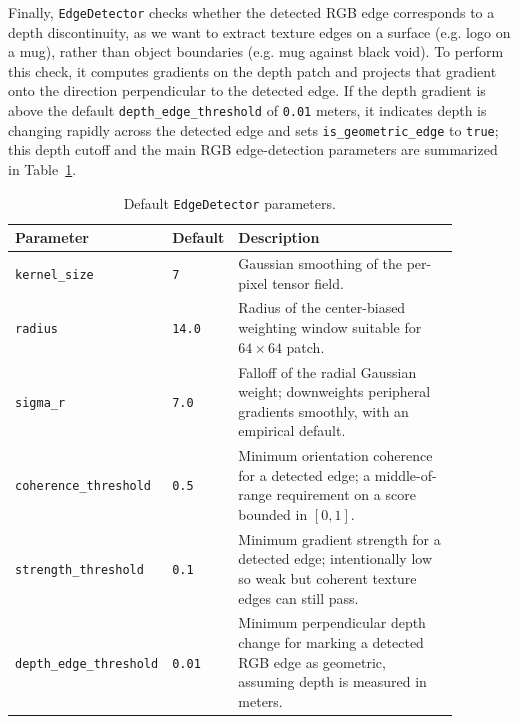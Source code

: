 \documentclass{article}
\begin{document}

Finally, \texttt{EdgeDetector} checks whether the detected RGB edge corresponds to a depth discontinuity, as we want to extract texture edges on a surface (e.g. logo on a mug), rather than object boundaries (e.g. mug against black void).
To perform this check, it computes gradients on the depth patch and projects that gradient onto the direction perpendicular to the detected edge.
If the depth gradient is above the default \texttt{depth\_edge\_threshold} of \texttt{0.01} meters, it indicates depth is changing rapidly across the detected edge and sets \texttt{is\_geometric\_edge} to \texttt{true}; this depth cutoff and the main RGB edge-detection parameters are summarized in Table~\ref{tab:edge-detector-parameters}.


\begin{table}[ht]
  \centering
  \begin{tabular}{p{0.25\linewidth} p{0.13\linewidth} p{0.50\linewidth}}
    \hline
    Parameter & Default & Description \\
    \hline
    \texttt{kernel\_size} & \texttt{7} & Gaussian smoothing of the per-pixel tensor field. \\
    \texttt{radius} & \texttt{14.0} & Radius of the center-biased weighting window suitable for $64 \times 64$ patch. \\
    \texttt{sigma\_r} & \texttt{7.0} & Falloff of the radial Gaussian weight; downweights peripheral gradients smoothly, with an empirical default. \\
    \texttt{coherence\_threshold} & \texttt{0.5} & Minimum orientation coherence for a detected edge; a middle-of-range requirement on a score bounded in $[0, 1]$. \\
    \texttt{strength\_threshold} & \texttt{0.1} & Minimum gradient strength for a detected edge; intentionally low so weak but coherent texture edges can still pass. \\
    \texttt{depth\_edge\_threshold} & \texttt{0.01} & Minimum perpendicular depth change for marking a detected RGB edge as geometric, assuming depth is measured in meters. \\
    \hline
  \end{tabular}
  \caption{Default \texttt{EdgeDetector} parameters.}
  \label{tab:edge-detector-parameters}
\end{table}
\end{document}
